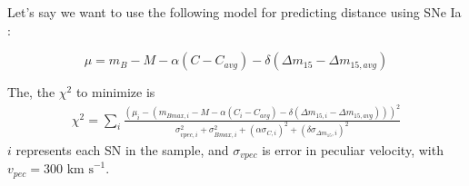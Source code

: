Let's say we want to use the following model for predicting distance using SNe Ia \cite{tripp1998}:

\begin{equation}
    \mu = m_{B} - M - \alpha(C - C_{avg})- \delta(\Delta m_{15} - \Delta m_{15, avg})
\end{equation}

The, the $\chi^{2}$ to minimize is
\begin{equation}
\begin{split}
    \chi^{2} = \sum_{i} \frac{(\mu_{i} - (m_{Bmax, i} - M -
    \alpha(C_{i}- C_{avg}) - \delta(\Delta m_{15, i} - \Delta m_{15,avg})))^{2}}{\sigma_{vpec, i}^{2} + \sigma_{Bmax, i}^{2} + (\alpha \sigma_{C, i})^{2} + (\delta \sigma_{\Delta m_{15}, i})^{2}}
    \end{split}
\end{equation}
$i$ represents each SN in the sample, and $\sigma_{vpec}$ is error in peculiar velocity, with $v_{pec} = 300 \mathrm{\,\,km\,\, s}^{-1}$.